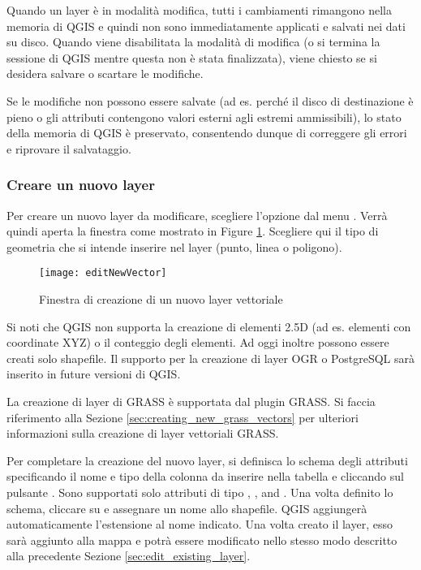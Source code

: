 
Quando un layer è in modalità modifica, tutti i cambiamenti rimangono nella
memoria di QGIS e quindi non sono immediatamente applicati e salvati nei dati
su disco. Quando viene disabilitata la modalità di modifica (o si termina la
sessione di QGIS mentre questa non è stata finalizzata), 
viene chiesto se si desidera salvare o scartare le modifiche.

Se le modifiche non possono essere salvate (ad es. perché il disco di
destinazione è pieno o gli attributi contengono valori esterni agli estremi
ammissibili), lo stato della memoria di QGIS è preservato, consentendo dunque
di correggere gli errori e riprovare il salvataggio.

\subsubsection{Creare un nuovo layer}\label{sec:create shape}

Per creare un nuovo layer da modificare, scegliere l'opzione
 dal menu . 
Verrà quindi aperta la finestra  come mostrato
in Figure \ref{fig:newvectorlayer}. Scegliere qui il tipo di geometria che si
intende inserire nel layer (punto, linea o poligono).

\begin{figure}[ht]
   \begin{center}
   \caption{Finestra di creazione di un nuovo layer vettoriale \nixcaption}\label{fig:newvectorlayer}\smallskip
   \texttt{[image: editNewVector]}
\end{center} 
\end{figure}

Si noti che QGIS non supporta la creazione di elementi 2.5D (ad es. elementi
con coordinate XYZ) o il conteggio degli elementi. Ad oggi inoltre possono
essere creati solo shapefile. Il supporto per la creazione di layer OGR o
PostgreSQL sarà inserito in future versioni di QGIS. 

La creazione di layer di GRASS è supportata dal plugin GRASS. Si faccia
riferimento alla Sezione \ref{sec:creating_new_grass_vectors} per ulteriori
informazioni sulla creazione di layer vettoriali GRASS.

Per completare la creazione del nuovo layer, si definisca lo schema degli
attributi specificando il nome e tipo della colonna da inserire nella tabella
e cliccando sul pulsante . Sono supportati solo
attributi di tipo , , and
. Una volta definito lo schema, cliccare su
 e assegnare un nome allo shapefile.
QGIS aggiungerà automaticamente l'estensione  al nome indicato.
Una volta creato il layer, esso sarà aggiunto alla mappa e potrà essere
modificato nello stesso modo descritto alla precedente Sezione \ref{sec:edit_existing_layer}. 

